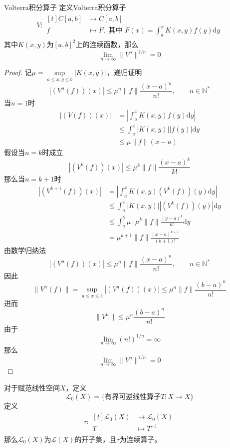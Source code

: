 \documentclass[lang = cn, scheme = chinese, thmcnt = section]{elegantbook}
\newcommand{\N}{\mathbb{N}}            %
\begin{document}
\begin{proposition}{Volterra积分算子}
	定义Volterra积分算子
	\begin{align*}
		V:\begin{aligned}[t]
			C[a,b]&\longrightarrow C[a,b]\\
			f&\longmapsto F,\text{ 其中 }F(x)=\int_a^xK(x,y)f(y)\mathrm{d}y
		\end{aligned}
	\end{align*}
	其中$K(x,y)$为$[a,b]^2$上的连续函数，那么
	$$
	\lim_{n\to\infty}\|V^n\|^{1/n}=0
	$$
\end{proposition}

\begin{proof}
	记$\mu=\sup\limits_{a\le x,y\le b}|K(x,y)|$，递归证明
	$$
	|(V^n(f))(x)|\le \mu^n\|f\|\frac{(x-a)^n}{n!},\qquad n\in\N^*
	$$
	当$n=1$时
	\begin{align*}
		|(V(f))(x)|
		& = \left|\int_a^xK(x,y)f(y)\mathrm{d}y\right|\\
		& \le \int_a^x|K(x,y)||f(y)|\mathrm{d}y\\
		& \le \mu\|f\|(x-a)
	\end{align*}
	假设当$n=k$时成立
	$$
	|(V^k(f))(x)|\le \mu^k\|f\|\frac{(x-a)^k}{k!}
	$$
	那么当$n=k+1$时
	\begin{align*}
		|(V^{k+1}(f))(x)|
		& = \left|\int_a^xK(x,y)(V^k(f))(y)\mathrm{d}y\right|\\
		& \le \int_a^x|K(x,y)||(V^k(f))(y)|\mathrm{d}y\\
		& \le \int_a^b\mu \cdot \mu^k\|f\|\frac{(y-a)^k}{k!}\mathrm{d}y\\
		& = \mu^{k+1}\|f\|\frac{(x-a)^{k+1}}{({k+1})!}
	\end{align*}
	由数学归纳法
	$$
	|(V^n(f))(x)|\le \mu^n\|f\|\frac{(x-a)^n}{n!},\qquad n\in\N^*
	$$
	因此
	$$
	\|V^n(f)\|=\sup_{a\le x\le b}|(V^n(f))(x)|\le \mu^n\|f\|\frac{(b-a)^n}{n!}
	$$
	进而
	$$
	\|V^n\|\le \mu^n\frac{(b-a)^n}{n!}
	$$
	由于
	$$
	\lim_{n\to\infty}(n!)^{1/n}=\infty
	$$
	那么
	$$
	\lim_{n\to\infty}\|V^n\|^{1/n}=0
	$$
\end{proof}

\begin{proposition}
	对于赋范线性空间$X$，定义
	$$
	\mathcal{L}_0(X)=\{ \text{有界可逆线性算子}T:X\to X \}
	$$
	定义
	\begin{align*}
		\tau:\begin{aligned}[t]
			\mathcal{L}_0(X)&\longrightarrow \mathcal{L}_0(X)\\
			T&\longmapsto T^{-1}
		\end{aligned}
	\end{align*}
	那么$\mathcal{L}_0(X)$为$\mathcal{L}(X)$的开子集，且$\tau$为连续算子。
\end{proposition}
\end{document}
